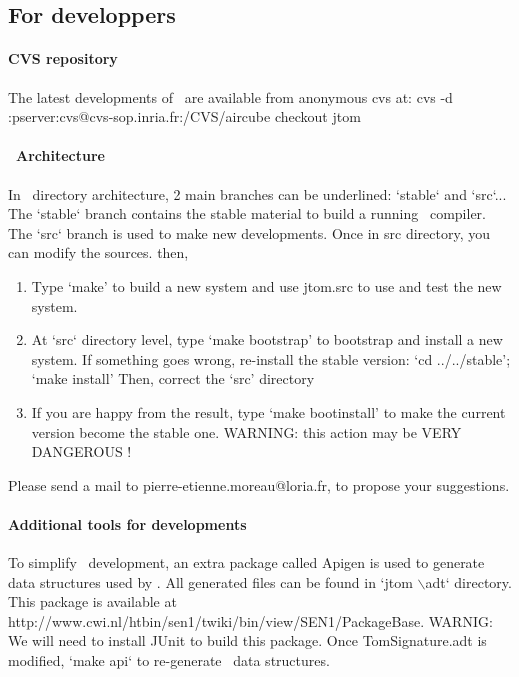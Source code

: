 \subsection{For developpers}
\paragraph{CVS repository}
The latest developments of \TOM\ are available from anonymous cvs at:
cvs -d :pserver:cvs@cvs-sop.inria.fr:/CVS/aircube checkout jtom
\paragraph{\TOM\ Architecture}
In \TOM\ directory architecture, 2 main branches can be underlined:
`stable` and `src`...
The `stable` branch contains the stable material to build a running
\TOM\ compiler. The `src` branch is used to make new developments.
Once in src directory, you can modify the sources. then, 
\begin{enumerate}
\item Type `make' to build a new system and use jtom.src to use and
  test the new system.
\item At `src` directory level, type `make bootstrap' to bootstrap and
  install a new system.
  If something goes wrong, re-install the stable version:
  `cd ../../stable'; `make install'
  Then, correct the `src' directory
\item If you are happy from the result, type `make bootinstall' to
  make the current version become the stable one.
     WARNING: this action may be VERY DANGEROUS !
\end{enumerate}
Please send a mail to pierre-etienne.moreau@loria.fr, to propose your
suggestions.

\paragraph{Additional tools for developments}
To simplify \TOM\ development, an extra package called Apigen is used
to generate data structures used by \TOM. All generated files can be
found in `jtom $\backslash$adt` directory.
This package is available at
http://www.cwi.nl/htbin/sen1/twiki/bin/view/SEN1/PackageBase.
WARNIG: We will need to install JUnit to build this package.
Once TomSignature.adt is modified, `make api` to re-generate \TOM\
data structures.
